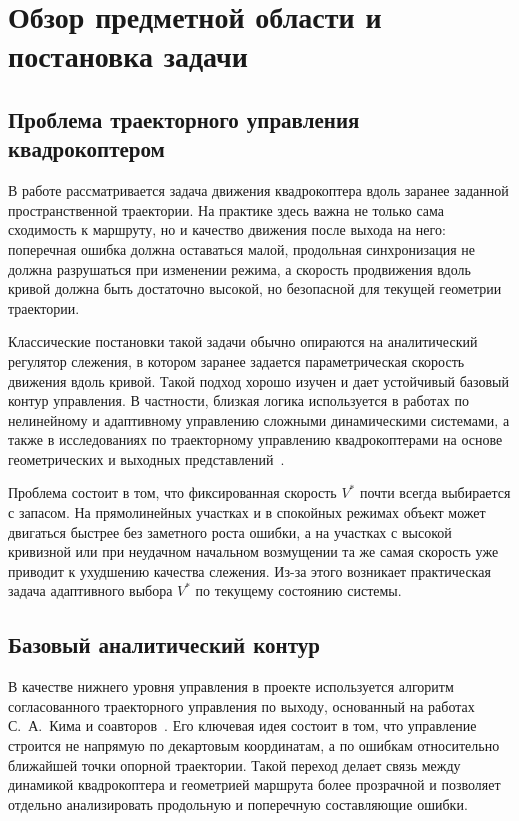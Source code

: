 ﻿\chapter{Обзор предметной области и постановка задачи}

\section{Проблема траекторного управления квадрокоптером}

В работе рассматривается задача движения квадрокоптера вдоль заранее заданной пространственной траектории.
На практике здесь важна не только сама сходимость к маршруту, но и качество движения после выхода на него: поперечная ошибка должна оставаться малой, продольная синхронизация не должна разрушаться при изменении режима, а скорость продвижения вдоль кривой должна быть достаточно высокой, но безопасной для текущей геометрии траектории.

Классические постановки такой задачи обычно опираются на аналитический регулятор слежения, в котором заранее задается параметрическая скорость движения вдоль кривой.
Такой подход хорошо изучен и дает устойчивый базовый контур управления.
В частности, близкая логика используется в работах по нелинейному и адаптивному управлению сложными динамическими системами, а также в исследованиях по траекторному управлению квадрокоптерами на основе геометрических и выходных представлений~\cite{miroshnik2000,borisov2021,kim2023,kim2024article}.

Проблема состоит в том, что фиксированная скорость $V^{\ast}$ почти всегда выбирается с запасом. На прямолинейных участках и в спокойных режимах объект может двигаться быстрее без заметного роста ошибки, а на участках с высокой кривизной или при неудачном начальном возмущении та же самая скорость уже приводит к ухудшению качества слежения. Из-за этого возникает практическая задача адаптивного выбора $V^{\ast}$ по текущему состоянию системы.

\section{Базовый аналитический контур}

В качестве нижнего уровня управления в проекте используется алгоритм согласованного траекторного управления по выходу, основанный на работах С.~А.~Кима и соавторов~\cite{kim_algorithms,kim2024article}. Его ключевая идея состоит в том, что управление строится не напрямую по декартовым координатам, а по ошибкам относительно ближайшей точки опорной траектории. Такой переход делает связь между динамикой квадрокоптера и геометрией маршрута более прозрачной и позволяет отдельно анализировать продольную и поперечную составляющие ошибки.

